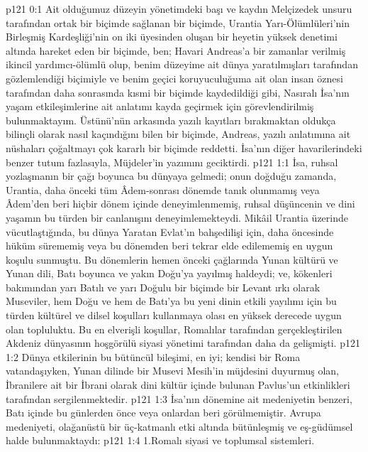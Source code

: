 \vs p121 0:1 Ait olduğumuz düzeyin yönetimdeki başı ve kaydın Melçizedek unsuru tarafından ortak bir biçimde sağlanan bir biçimde, Urantia Yarı\hyp{}Ölümlüleri’nin Birleşmiş Kardeşliği’nin on iki üyesinden oluşan bir heyetin yüksek denetimi altında hareket eden bir biçimde, ben; Havari Andreas’a bir zamanlar verilmiş ikincil yardımcı\hyp{}ölümlü olup, benim düzeyime ait dünya yaratılmışları tarafından gözlemlendiği biçimiyle ve benim geçici koruyuculuğuma ait olan insan öznesi tarafından daha sonrasında kısmi bir biçimde kaydedildiği gibi, Nasıralı İsa’nın yaşam etkileşimlerine ait anlatımı kayda geçirmek için görevlendirilmiş bulunmaktayım. Üstünü’nün arkasında yazılı kayıtları bırakmaktan oldukça bilinçli olarak nasıl kaçındığını bilen bir biçimde, Andreas, yazılı anlatımına ait nüshaları çoğaltmayı çok kararlı bir biçimde reddetti. İsa’nın diğer havarilerindeki benzer tutum fazlasıyla, Müjdeler’in yazımını geciktirdi.
\vs p121 1:1 İsa, ruhsal yozlaşmanın bir çağı boyunca bu dünyaya gelmedi; onun doğduğu zamanda, Urantia, daha önceki tüm Âdem\hyp{}sonrası dönemde tanık olunmamış veya Âdem’den beri hiçbir dönem içinde deneyimlenmemiş, ruhsal düşüncenin ve dini yaşamın bu türden bir canlanışını deneyimlemekteydi. Mikâil Urantia üzerinde vücutlaştığında, bu dünya Yaratan Evlat’ın bahşedilişi için, daha öncesinde hüküm sürememiş veya bu dönemden beri tekrar elde edilememiş en uygun koşulu sunmuştu. Bu dönemlerin hemen önceki çağlarında Yunan kültürü ve Yunan dili, Batı boyunca ve yakın Doğu’ya yayılmış haldeydi; ve, kökenleri bakımından yarı Batılı ve yarı Doğulu bir biçimde bir Levant ırkı olarak Museviler, hem Doğu ve hem de Batı’ya bu yeni dinin etkili yayılımı için bu türden kültürel ve dilsel koşulları kullanmaya olası en yüksek derecede uygun olan topluluktu. Bu en elverişli koşullar, Romalılar tarafından gerçekleştirilen Akdeniz dünyasının hoşgörülü siyasi yönetimi tarafından daha da gelişmişti.
\vs p121 1:2 Dünya etkilerinin bu bütüncül bileşimi, en iyi; kendisi bir Roma vatandaşıyken, Yunan dilinde bir Musevi Mesih’in müjdesini duyurmuş olan, İbranilere ait bir İbrani olarak dini kültür içinde bulunan Pavlus’un etkinlikleri tarafından sergilenmektedir.
\vs p121 1:3 İsa’nın dönemine ait medeniyetin benzeri, Batı içinde bu günlerden önce veya onlardan beri görülmemiştir. Avrupa medeniyeti, olağanüstü bir üç\hyp{}katmanlı etki altında bütünleşmiş ve eş\hyp{}güdümsel halde bulunmaktaydı:
\vs p121 1:4 1.\bibnobreakspace Romalı siyasi ve toplumsal sistemleri.
